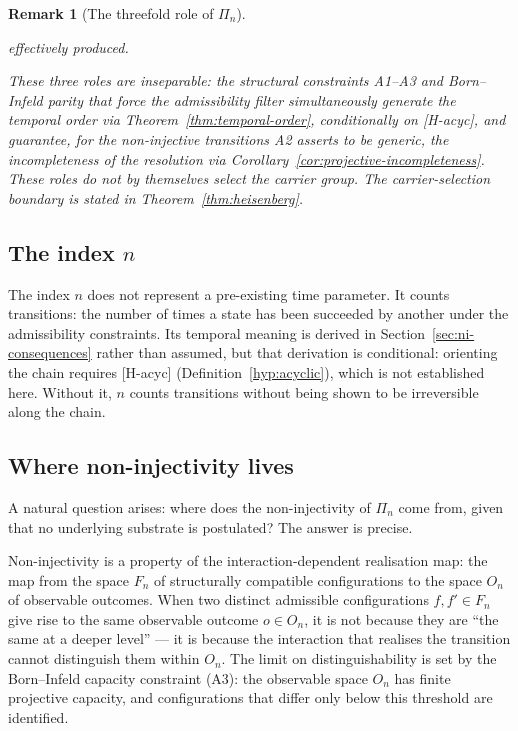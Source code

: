 \documentclass[11pt,a4paper]{article}
\newtheorem{remark}[theorem]{Remark}
\begin{document}
\begin{remark}[The threefold role of $\Pi_n$]
\begin{enumerate}[(i)]
        effectively produced.
      \end{enumerate}
      These three roles are inseparable: the structural constraints A1--A3 and
      Born--Infeld parity that force the admissibility filter simultaneously
      generate the temporal order via Theorem~\ref{thm:temporal-order}, conditionally
      on \textup{[H-acyc]}, and
      guarantee, for the non-injective transitions A2 asserts to be generic, the
      incompleteness of the resolution via Corollary~\ref{cor:projective-incompleteness}.
      These roles do not by themselves select the carrier group.
      The carrier-selection boundary is stated in
      Theorem~\ref{thm:heisenberg}.
    \end{remark}

  \subsection{The index $n$}

    The index $n$ does not represent a pre-existing time parameter.
    It counts transitions: the number of times a state has been succeeded by
    another under the admissibility constraints.
    Its temporal meaning is derived in Section~\ref{sec:ni-consequences} rather than assumed,
    but that derivation is conditional: orienting the chain requires \textup{[H-acyc]}
    (Definition~\ref{hyp:acyclic}), which is not established here.
    Without it, $n$ counts transitions without being shown to be irreversible along the chain.

  \subsection{Where non-injectivity lives}
    \label{subsec:ni-locus}

    A natural question arises: where does the non-injectivity of $\Pi_n$ come from,
    given that no underlying substrate is postulated?
    The answer is precise.

    Non-injectivity is a property of the interaction-dependent realisation map:
    the map from the space $F_n$ of structurally compatible configurations to the space
    $O_n$ of observable outcomes.
    When two distinct admissible configurations $f, f' \in F_n$ give rise to
    the same observable outcome $o \in O_n$, it is not because they are
    ``the same at a deeper level'' — it is because the interaction that
    realises the transition cannot distinguish them within $O_n$.
    The limit on distinguishability is set by the Born--Infeld capacity
    constraint (A3): the observable space $O_n$ has finite projective capacity,
    and configurations that differ only below this threshold are identified.
\end{document}
